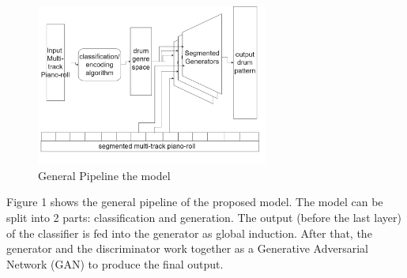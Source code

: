 \begin{par}
    \begin{figure}[H]
        \centering
        \includegraphics[width=3in]{image/proposal_architecture}
        \caption{General Pipeline the model}
        \label{fig:archie}
    \end{figure}
\end{par}

\begin{par}
    \par \hspace{15pt} Figure 1 shows the general pipeline of the proposed model. The model can be split into 2 parts: classification and generation. The output (before the last layer) of the classifier is fed into the generator as global induction. After that, the generator and the discriminator work together as a Generative Adversarial Network (GAN) to produce the final output.
\end{par}